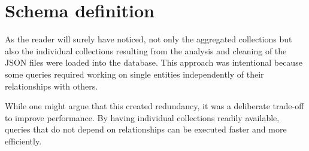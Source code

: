 \documentclass{Configuration_Files/PoliMi3i_thesis}
\begin{document}
\bigskip

\section{Schema definition}
As the reader will surely have noticed, not only the aggregated collections but also the individual collections resulting from the analysis and cleaning of the JSON files were loaded into the database. This approach was intentional because some queries required working on single entities independently of their relationships with others.

While one might argue that this created redundancy, it was a deliberate trade-off to improve performance. By having individual collections readily available, queries that do not depend on relationships can be executed faster and more efficiently.
\end{document}
